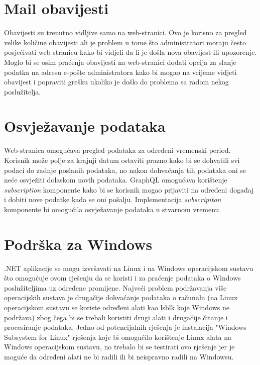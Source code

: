 \documentclass[zavrsnirad]{fer}
\begin{document}
\section{Mail obavijesti}
Obavijesti su trenutno vidljive samo na web-stranici. Ovo je korisno za pregled velike količine obavijesti ali je problem u tome što administratori moraju često posjećivati web-stranicu kako bi vidjeli da li je došla nova obavijest ili upozorenje. Moglo bi se osim praćenja obavijesti na web-stranici dodati opcija za slanje podatka na adresu e-pošte administratora kako bi mogao na vrijeme vidjeti obavijest i popraviti grešku ukoliko je došlo do problema sa radom nekog poslužitelja.

\section{Osvježavanje podataka}
Web-stranica omogućava pregled podataka za određeni vremenski period. Korisnik može polje za krajnji datum ostaviti prazno kako bi se dohvatili svi podaci do zadnje poslanih podataka, no nakon dohvaćanja tih podataka oni se neće osvježiti dolaskom novih podataka. GraphQL omogućava korištenje \textit{subscription} komponente kako bi se korisnik mogao prijaviti na određeni događaj i dobiti nove podatke kada se oni pošalju. Implementacija \textit{subscripiton} komponente bi omogućila osvježavanje podataka u stvarnom vremenu.

\section{Podrška za Windows}
.NET aplikacije se mogu izvršavati na Linux i na Windows operacijskom sustavu što omogućuje ovom rješenju da se koristi i za praćenje podataka o Windows poslužiteljima uz određene promijene. Najveći problem podržavanja više operacijskih sustava je drugačije dohvaćanje podataka o računalu (na Linux operacijskom sustavu se koriste određeni alati kao lsblk koje Windows ne podržava) zbog čega bi se trebali koristiti drugi alati i drugačije čitanje i procesiranje podataka. Jedno od potencijalnih rješenja je instalacija "Windows Subsystem for Linux" rješenja koje bi omogućilo korištenje Linux alata na Windows operacijskom sustavu, no trebalo bi se testirati ovo rješenje jer je moguće da određeni alati ne bi radili ili bi neispravno radili na Windowsu.



\end{document}
